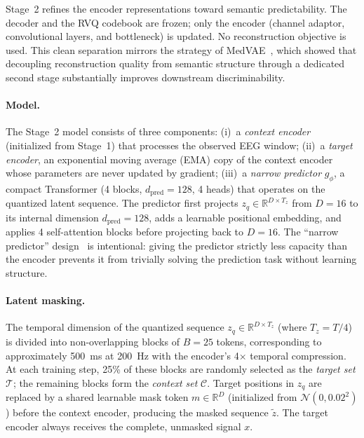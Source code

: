 \documentclass{article}
\begin{document}
Stage~2 refines the encoder representations toward semantic predictability.
The decoder and the RVQ codebook are frozen; only the encoder (channel adaptor, convolutional layers, and bottleneck) is updated.
No reconstruction objective is used.
This clean separation mirrors the strategy of MedVAE~\citep{varma2025medvaeefficientautomatedinterpretation}, which showed that decoupling reconstruction quality from semantic structure through a dedicated second stage substantially improves downstream discriminability.

\paragraph{Model.}
The Stage~2 model consists of three components:
(i)~a \emph{context encoder} (initialized from Stage~1) that processes the observed EEG window;
(ii)~a \emph{target encoder}, an exponential moving average (EMA) copy of the context encoder whose parameters are never updated by gradient;
(iii)~a \emph{narrow predictor} $g_\phi$, a compact Transformer (4 blocks, $d_{\mathrm{pred}} = 128$, 4 heads) that operates on the quantized latent sequence.
The predictor first projects $z_q \in \mathbb{R}^{D \times T_z}$ from $D = 16$ to its internal dimension $d_{\mathrm{pred}} = 128$, adds a learnable positional embedding, and applies 4 self-attention blocks before projecting back to $D = 16$.
The ``narrow predictor'' design~\citep{assran2023selfsupervisedlearningimagesjointembedding} is intentional: giving the predictor strictly less capacity than the encoder prevents it from trivially solving the prediction task without learning structure.

\paragraph{Latent masking.}
The temporal dimension of the quantized sequence $z_q \in \mathbb{R}^{D \times T_z}$ (where $T_z = T/4$) is divided into non-overlapping blocks of $B = 25$ tokens, corresponding to approximately 500~ms at 200~Hz with the encoder's 4$\times$ temporal compression.
At each training step, 25\% of these blocks are randomly selected as the \emph{target set} $\mathcal{T}$; the remaining blocks form the \emph{context set} $\mathcal{C}$.
Target positions in $z_q$ are replaced by a shared learnable mask token $m \in \mathbb{R}^D$ (initialized from $\mathcal{N}(0, 0.02^2)$) before the context encoder, producing the masked sequence $\tilde{z}$.
The target encoder always receives the complete, unmasked signal $x$.
\end{document}
